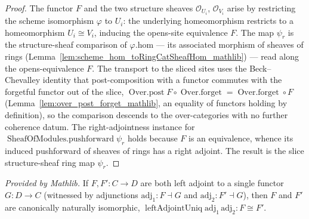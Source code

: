 \begin{proof}
  The functor \(F\) and the two structure sheaves \(\mathcal{O}_{U_i}\), \(\mathcal{O}_{V_i}\) arise by
  restricting the scheme isomorphism \(\varphi\) to \(U_i\): the underlying homeomorphism restricts to a
  homeomorphism \(U_i \cong V_i\), inducing the opens-site equivalence \(F\). The map \(\psi_r\) is the
  structure-sheaf comparison of \(\varphi.\mathrm{hom}\) — its associated morphism of sheaves of rings
  (Lemma~\ref{lem:scheme_hom_toRingCatSheafHom_mathlib}) — read along the opens-equivalence \(F\). The
  transport to the sliced sites uses the Beck--Chevalley identity that post-composition with a functor
  commutes with the forgetful functor out of the slice,
  \(\operatorname{Over.post} F \circ \operatorname{Over.forget} = \operatorname{Over.forget} \circ F\)
  (Lemma~\ref{lem:over_post_forget_mathlib}, an equality of functors holding by definition),
  so the comparison descends to the over-categories with no further coherence datum. The
  right-adjointness instance for \(\operatorname{SheafOfModules.pushforward}\psi_r\) holds because \(F\)
  is an equivalence, whence its induced pushforward of sheaves of rings has a right adjoint. The result
  is the slice structure-sheaf ring map \(\psi_r\).
\end{proof}


\begin{lemma}
  \label{lem:leftAdjointUniq_mathlib}
  \mathlibok
  \textit{Provided by Mathlib.}
  If \(F, F' : C \to D\) are both left adjoint to a single functor \(G : D \to C\) (witnessed by
  adjunctions \(\mathrm{adj}_1 : F \dashv G\) and \(\mathrm{adj}_2 : F' \dashv G\)), then \(F\) and
  \(F'\) are canonically naturally isomorphic,
  \(\operatorname{leftAdjointUniq}\mathrm{adj}_1\,\mathrm{adj}_2 : F \cong F'\).
\end{lemma}


